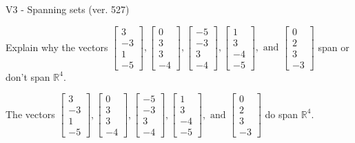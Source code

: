 \begin{exercise}
  \begin{exerciseTitle}V3 - Spanning sets (ver. 527)\end{exerciseTitle}
  \begin{exerciseStatement}
    Explain why the vectors \(\left[\begin{array}{r}
3 \\
-3 \\
1 \\
-5
\end{array}\right] , \left[\begin{array}{r}
0 \\
3 \\
3 \\
-4
\end{array}\right] , \left[\begin{array}{r}
-5 \\
-3 \\
3 \\
-4
\end{array}\right] , \left[\begin{array}{r}
1 \\
3 \\
-4 \\
-5
\end{array}\right] , \text{ and } \left[\begin{array}{r}
0 \\
2 \\
3 \\
-3
\end{array}\right]\) span or don't span \(\mathbb{R}^4\). 
	


  \end{exerciseStatement}
  \begin{exerciseAnswer}
   The vectors \(\left[\begin{array}{r}
3 \\
-3 \\
1 \\
-5
\end{array}\right] , \left[\begin{array}{r}
0 \\
3 \\
3 \\
-4
\end{array}\right] , \left[\begin{array}{r}
-5 \\
-3 \\
3 \\
-4
\end{array}\right] , \left[\begin{array}{r}
1 \\
3 \\
-4 \\
-5
\end{array}\right] , \text{ and } \left[\begin{array}{r}
0 \\
2 \\
3 \\
-3
\end{array}\right]\) 
  	 do  
	span \(\mathbb{R}^4\).
  



\end{exerciseAnswer}
\end{exercise}
